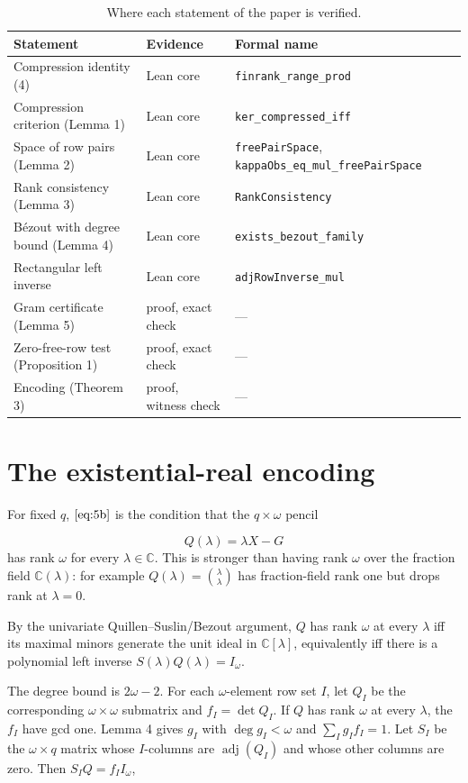 \documentclass[journal]{IEEEtran}
\theoremstyle{plainn}
\begin{document}
\begin{table}[!t]
\centering
\caption{Where each statement of the paper is verified.}\label{tab:evidence}
\small
\begin{tabular}{@{}lll@{}}
\toprule
Statement & Evidence & Formal name \\
\midrule
Compression identity (4) & Lean core & \texttt{finrank\_range\_prod} \\
Compression criterion (Lemma 1) & Lean core & \texttt{ker\_compressed\_iff} \\
Space of row pairs (Lemma 2) & Lean core & \texttt{freePairSpace},
\texttt{kappaObs\_eq\_mul\_freePairSpace} \\
Rank consistency (Lemma 3) & Lean core & \texttt{RankConsistency} \\
B\'ezout with degree bound (Lemma 4) & Lean core & \texttt{exists\_bezout\_family} \\
Rectangular left inverse & Lean core & \texttt{adjRowInverse\_mul} \\
Gram certificate (Lemma 5) & proof, exact check & --- \\
Zero-free-row test (Proposition 1) & proof, exact check & --- \\
Encoding (Theorem 3) & proof, witness check & --- \\
\bottomrule
\end{tabular}
\end{table}

\appendices
\section{The existential-real encoding}\label{app:encoding}
For fixed $q$, $\eqref{eq:5b}$ is the condition that the $q\times\omega$ pencil

\begin{equation}
Q(\lambda)=\lambda X-G
\end{equation}
has rank $\omega$ for every $\lambda\in\mathbb C$. This is stronger than having rank $\omega$ over the fraction field $\mathbb C(\lambda)$: for example $Q(\lambda)=\binom{\lambda}{\lambda}$ has fraction-field rank one but drops rank at $\lambda=0$.

By the univariate Quillen--Suslin/Bezout argument, $Q$ has rank $\omega$ at every $\lambda$ iff its maximal minors generate the unit ideal in $\mathbb C[\lambda]$, equivalently iff there is a polynomial left inverse $S(\lambda)Q(\lambda)=I_\omega$.

The degree bound is $2\omega-2$. For each $\omega$-element row set $I$, let $Q_I$ be the corresponding $\omega\times\omega$ submatrix and $f_I=\det Q_I$. If $Q$ has rank $\omega$ at every $\lambda$, the $f_I$ have gcd one. Lemma 4 gives $g_I$ with $\deg g_I<\omega$ and $\sum_I g_I f_I=1$. Let $S_I$ be the $\omega\times q$ matrix whose $I$-columns are $\operatorname{adj}(Q_I)$ and whose other columns are zero. Then $S_I Q=f_I I_\omega$,
\end{document}
